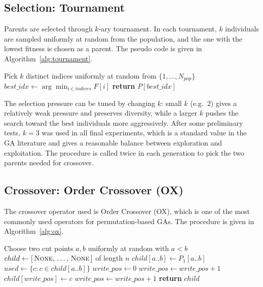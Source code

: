\documentclass [a4paper, 11pt, titlepage] {article}
\begin{document}
\subsection{Selection: Tournament}
\label{sec:selection}

Parents are selected through $k$-ary tournament. In each tournament, $k$ individuals are sampled uniformly at random from the population, and the one with the lowest fitness is chosen as a parent. The pseudo code is given in Algorithm~\ref{alg:tournament}.

\begin{algorithm}[H]
\caption{Tournament Selection}
\label{alg:tournament}
\begin{algorithmic}[1]
    \State Pick $k$ distinct indices uniformly at random from $\{1, \ldots, N_{pop}\}$
    \State $best\_idx \gets \arg\min_{i \in indices} F[i]$
    \State \textbf{return} $P[best\_idx]$
\end{algorithmic}
\end{algorithm}

The selection pressure can be tuned by changing $k$: small $k$ (e.g.\ $2$) gives a relatively weak pressure and preserves diversity, while a larger $k$ pushes the search toward the best individuals more aggressively. After some preliminary tests, $k = 3$ was used in all final experiments, which is a standard value in the GA literature and gives a reasonable balance between exploration and exploitation. The procedure is called twice in each generation to pick the two parents needed for crossover.

\subsection{Crossover: Order Crossover (OX)}
\label{sec:ox}

The crossover operator used is Order Crossover (OX), which is one of the most commonly used operators for permutation-based GAs. The procedure is given in Algorithm~\ref{alg:ox}.

\begin{algorithm}[H]
\caption{Order Crossover (OX)}
\label{alg:ox}
\begin{algorithmic}[1]
    \State Choose two cut points $a, b$ uniformly at random with $a < b$
    \State $child \gets [\,\textsc{None},\, \ldots,\, \textsc{None}\,]$ of length $n$
    \State $child[a..b] \gets P_1[a..b]$ 
    \State $used \gets \{ c : c \in child[a..b] \}$
    \State $write\_pos \gets 0$
                \State $write\_pos \gets write\_pos + 1$
            \EndWhile
            \State $child[write\_pos] \gets c$
            \State $write\_pos \gets write\_pos + 1$
        \EndIf
    \EndFor
    \State \textbf{return} $child$
\end{algorithmic}
\end{algorithm}
\end{document}
